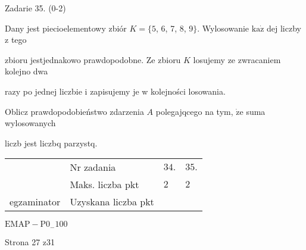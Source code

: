 \documentclass[a4paper,12pt]{article}
\begin{document}
Zadarie 35. (0-2)

Dany jest piecioelementowy zbiór $K=\{5$, 6, 7, 8, 9$\}$. Wylosowanie $\mathrm{k}\mathrm{a}\dot{\mathrm{z}}$ dej liczby z tego

zbioru jestjednakowo prawdopodobne. Ze zbioru $K$ losujemy ze zwracaniem kolejno dwa

razy po jednej liczbie i zapisujemy je w kolejności losowania.

Oblicz prawdopodobieństwo zdarzenia $A$ polegajqcego na tym, $\dot{\mathrm{z}}\mathrm{e}$ suma wylosowanych

liczb jest liczbq parzystq.
\begin{center}
\begin{tabular}{|l|l|l|l|}
\cline{2-4}
&	\multicolumn{1}{|l|}{Nr zadania}&	\multicolumn{1}{|l|}{$34.$}&	\multicolumn{1}{|l|}{ $35.$}	\\
\cline{2-4}
&	\multicolumn{1}{|l|}{Maks. liczba pkt}&	\multicolumn{1}{|l|}{$2$}&	\multicolumn{1}{|l|}{ $2$}	\\
\cline{2-4}
\multicolumn{1}{|l|}{egzaminator}&	\multicolumn{1}{|l|}{Uzyskana liczba pkt}&	\multicolumn{1}{|l|}{}&	\multicolumn{1}{|l|}{}	\\
\hline
\end{tabular}

\end{center}
$\mathrm{E}\mathrm{M}\mathrm{A}\mathrm{P}-\mathrm{P}0_{-}100$

Strona 27 z31
\end{document}
